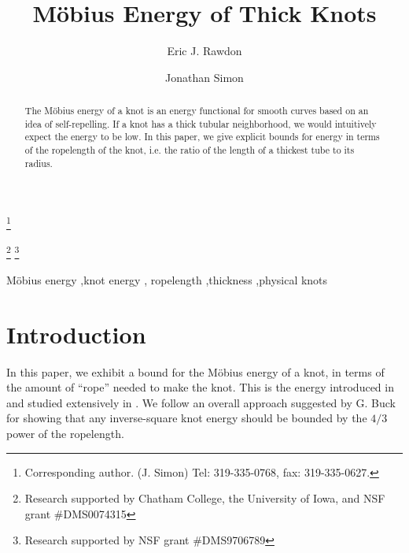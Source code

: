 \documentclass{elsart}
\begin{document}
\begin{frontmatter}
\title{M\"obius Energy of Thick Knots}

\author{Eric J. Rawdon}
\address{Department of Mathematics and Computer Science,\\
Duquesne University,\\ Pittsburgh, PA 15282, USA\\ Email:
rawdon@mathcs.duq.edu}

\author{Jonathan
Simon}
\address{Department of Mathematics,\\ University of
Iowa,\\ Iowa City, IA 52242, USA\\ Email:
jsimon@math.uiowa.edu}

\thanks[corresp]{Corresponding author. (J. Simon) Tel:
319-335-0768,  fax: 319-335-0627.}

\thanks[Rawdon]{Research supported by Chatham College,
the University of Iowa, and NSF grant \#DMS0074315}
\thanks[Simon]{Research supported by NSF grant
\#DMS9706789}



\begin{abstract} 
The M\"obius energy of a knot is an
energy functional for smooth curves based on an idea of
self-repelling.  If a knot has a thick tubular 
neighborhood, we would intuitively expect the energy to
be low. In this paper, we give explicit bounds for energy
in terms of the ropelength of the knot, i.e.{} the ratio
of the length of a thickest tube  to its radius.
\end{abstract}

\begin{keyword} M\"obius energy \sep knot energy \sep
ropelength
\sep thickness \sep physical knots
\end{keyword}
\end{frontmatter}

\section{Introduction}

In this paper, we exhibit a bound for the M\"obius energy
of a knot, in terms of the amount of ``rope'' needed to
make the knot.  This is the energy introduced in 
\cite{O1} and studied extensively in
\cite{FHW,KS}.  We follow an overall approach suggested
by G. Buck for showing that any inverse-square knot
energy should be bounded by the $4/3$ power  of
the ropelength.
\end{document}
